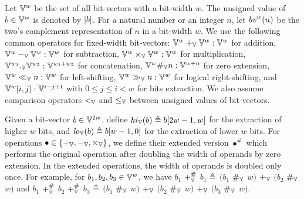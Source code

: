 Let $\mathbb{V}^w$ be the set of all bit-vectors with a bit-width $w$.
The unsigned value of $b \in \mathbb{V}^w$ is denoted by $|b|$.
For a natural number or an integer $n$, let $\mathit{bv}^w(n)$ be the two's complement representation of $n$ in a bit-width $w$.
We use the following common operators for fixed-width bit-vectors: $\mathbb{V}^w +_{\mathbb{V}} \mathbb{V}^w : \mathbb{V}^w$ for addition, $\mathbb{V}^w -_{\mathbb{V}} \mathbb{V}^w : \mathbb{V}^w$ for subtraction, $\mathbb{V}^w \times_{\mathbb{V}} \mathbb{V}^w : \mathbb{V}^w$ for multiplication, $\mathbb{V}^{w_1} ._{\mathbb{V}} \mathbb{V}^{w_2} : \mathbb{V}^{w_1 + w_2}$ for concatenation, $\mathbb{V}^w \#_{\mathbb{V}} n : \mathbb{V}^{w+n}$ for zero extension, $\mathbb{V}^w \ll_{\mathbb{V}} n : \mathbb{V}^w$ for left-shifting, $\mathbb{V}^w \gg_{\mathbb{V}} n : \mathbb{V}^w$ for logical right-shifting, and $\mathbb{V}^w[i,j] : \mathbb{V}^{i - j + 1}$ with $0 \leq j \leq i < w$ for bits extraction.
We also assume comparison operators $<_{\mathbb{V}}$ and $\leq_{\mathbb{V}}$ between unsigned values of bit-vectors.

Given a bit-vector $b \in \mathbb{V}^{2w}$, define $\mathit{hi}_{\mathbb{V}}(b) \triangleq b[2w - 1, w]$ for the extraction of higher $w$ bits, and $\mathit{lo}_{\mathbb{V}}(b) \triangleq b[w - 1, 0]$ for the extraction of lower $w$ bits.
For operations $\bullet \in \{+_{\mathbb{V}}, -_{\mathbb{V}}, \times_{\mathbb{V}}\}$, we define their extended version $\bullet^\#$ which performs the original operation after doubling the width of operands by zero extension.
In the extended operations, the width of operands is doubled only once.
For example, for $b_1, b_2, b_3 \in \mathbb{V}^{w}$, we have $b_1$ $+_{\mathbb{V}}^\#$ $b_1$ $\triangleq$ $(b_1$ $\#_{\mathbb{V}}$ $w)$ $+_{\mathbb{V}}$ $(b_2$ $\#_{\mathbb{V}}$ $w)$ and $b_1$ $+_{\mathbb{V}}^{\#}$ $b_2$ $+_{\mathbb{V}}^{\#}$ $b_3$ $\triangleq$ $(b_1$ $\#_{\mathbb{V}}$ $w)$ $+_{\mathbb{V}}$ $(b_2$ $\#_{\mathbb{V}}$ $w)$ $+_{\mathbb{V}}$ $(b_3$ $\#_{\mathbb{V}}$ $w)$.



